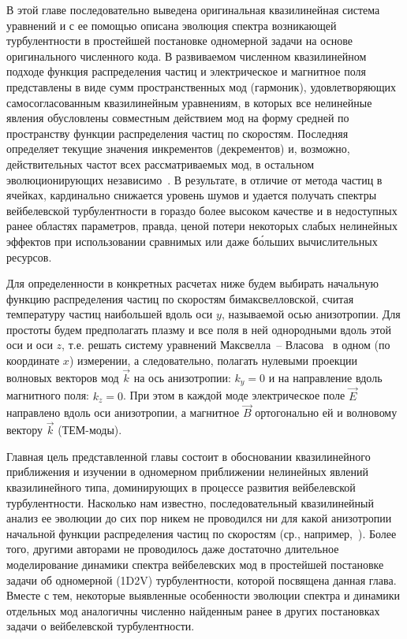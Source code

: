 В этой главе последовательно выведена оригинальная квазилинейная система уравнений и с ее помощью описана эволюция спектра возникающей турбулентности в простейшей постановке одномерной задачи на основе оригинального численного кода.
В развиваемом численном квазилинейном подходе функция распределения частиц и электрическое и магнитное поля представлены в виде сумм пространственных мод (гармоник), удовлетворяющих самосогласованным квазилинейным уравнениям, в которых все нелинейные явления обусловлены совместным действием мод на форму средней по пространству функции распределения частиц по скоростям. 
Последняя определяет текущие значения инкрементов (декрементов) и, возможно, действительных частот всех рассматриваемых мод, в остальном эволюционирующих независимо~\cite{Kuznetsov2023}. 
В результате, в отличие от метода частиц в ячейках, кардинально снижается уровень шумов и удается получать спектры вейбелевской турбулентности в гораздо более высоком качестве и в недоступных ранее областях параметров, правда, ценой потери некоторых слабых нелинейных эффектов при использовании сравнимых или даже б\'{о}льших вычислительных ресурсов.

Для определенности в конкретных расчетах ниже будем выбирать начальную функцию распределения частиц по скоростям бимаксвелловской, считая температуру частиц наибольшей вдоль оси $y$, называемой осью анизотропии. 
Для простоты будем предполагать плазму и все поля в ней однородными вдоль этой оси и оси $z$, т.е. решать систему уравнений Максвелла~-- Власова~\cite{Baumjohann2012} в одном (по координате $x$) измерении, а следовательно, полагать нулевыми проекции волновых векторов мод $\vec{k}$ на ось анизотропии: $k_y=0$ и на направление вдоль магнитного поля: $k_z=0$. 
При этом в каждой моде электрическое поле $\vec{E}$ направлено вдоль оси анизотропии, а магнитное $\vec{B}$ ортогонально ей и волновому вектору $\vec{k}$ (ТЕМ-моды). 

Главная цель представленной главы состоит в обосновании квазилинейного приближения и изучении в одномерном приближении нелинейных явлений квазилинейного типа, доминирующих в процессе развития вейбелевской турбулентности. 
Насколько нам известно, последовательный квазилинейный анализ ее эволюции до сих пор никем не проводился ни для какой анизотропии начальной функции распределения частиц по скоростям (ср., например,~\cite{Ruyer2015,Seough2015b,Pokhotelov2011,Davidson1972}). 
Более того, другими авторами не проводилось даже достаточно длительное моделирование динамики спектра вейбелевских мод в простейшей постановке задачи об одномерной (1D2V) турбулентности, которой посвящена данная глава. 
Вместе с тем, некоторые выявленные особенности эволюции спектра и динамики отдельных мод аналогичны численно найденным ранее в других постановках задачи о вейбелевской турбулентности.

